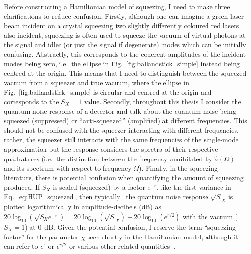 Before constructing a Hamiltonian model of squeezing, I need to make three clarifications to reduce confusion. Firstly, although one can imagine a green laser beam incident on a crystal squeezing two slightly differently coloured red lasers also incident, squeezing is often used to squeeze the vacuum of virtual photons at the signal and idler (or just the signal if degenerate) modes which can be initially confusing. Abstractly, this corresponds to the coherent amplitudes of the incident modes being zero, i.e.\ the ellipse in Fig.~\ref{fig:ballandstick_simple} instead being centred at the origin. This means that I need to distinguish between the squeezed vacuum from a squeezer and true vacuum, where the ellipse in Fig.~\ref{fig:ballandstick_simple} is circular and centred at the origin and corresponds to the $S_X=1$ value. 
Secondly, throughout this thesis I consider the quantum noise response of a detector and talk about the quantum noise being squeezed (suppressed) or ``anti-squeezed'' (amplified) at different frequencies. This should not be confused with the squeezer interacting with different frequencies, rather, the squeezer still interacts with the same frequencies of the single-mode approximation but the response considers the spectra of their respective quadratures (i.e.\ the distinction between the frequency annihilated by ${\hat a} (\Omega)$ and its spectrum with respect to frequency $\Omega$). Finally, in the squeezing literature, there is potential confusion when quantifying the amount of squeezing produced. If $S_X$ is scaled (squeezed) by a factor $e^{-r}$, like the first variance in Eq.~\ref{eq:HUP_squeezed}, then typically~\cite{} the quantum noise response $\sqrt S_X$ is plotted logarithmically in amplitude-decibels (dB) as $20 \log_{10}(\sqrt {S_X e^{-r}})=20 \log_{10}(\sqrt S_X) - 20\log_{10}(e^{r/2})$ with the vacuum ($S_X=1$) at $0$~dB. Given the potential confusion, I reserve the term ``squeezing factor'' for the parameter $\chi$ seen shortly in the Hamiltonian model, although it can refer to $e^r$ or $e^{r/2}$ or various other related quantities~\cite{}.



